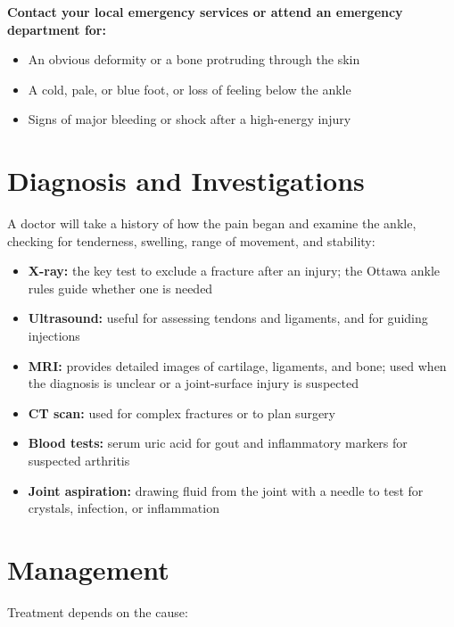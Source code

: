 \textbf{Contact your local emergency services or attend an emergency department for:}
\begin{itemize}
    \item An obvious deformity or a bone protruding through the skin
    \item A cold, pale, or blue foot, or loss of feeling below the ankle
    \item Signs of major bleeding or shock after a high-energy injury
\end{itemize}

\section*{Diagnosis and Investigations}
A doctor will take a history of how the pain began and examine the ankle, checking for tenderness, swelling, range of movement, and stability:

\begin{itemize}
    \item \textbf{X-ray:} the key test to exclude a fracture after an injury; the Ottawa ankle rules guide whether one is needed
    \item \textbf{Ultrasound:} useful for assessing tendons and ligaments, and for guiding injections
    \item \textbf{MRI:} provides detailed images of cartilage, ligaments, and bone; used when the diagnosis is unclear or a joint-surface injury is suspected
    \item \textbf{CT scan:} used for complex fractures or to plan surgery
    \item \textbf{Blood tests:} serum uric acid for gout and inflammatory markers for suspected arthritis
    \item \textbf{Joint aspiration:} drawing fluid from the joint with a needle to test for crystals, infection, or inflammation
\end{itemize}

\section*{Management}
Treatment depends on the cause:

